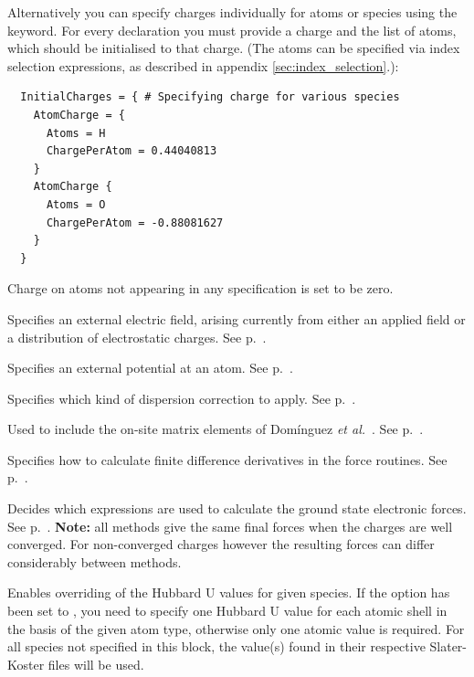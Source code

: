 \begin{description}
Alternatively you can specify charges individually for atoms or species using the 
keyword. For every  declaration you must provide a charge and the list of atoms,
which should be initialised to that charge. (The atoms can be specified via index selection
expressions, as described in appendix \ref{sec:index_selection}.):

\begin{verbatim}
  InitialCharges = { # Specifying charge for various species
    AtomCharge = {
      Atoms = H
      ChargePerAtom = 0.44040813
    }
    AtomCharge {
      Atoms = O
      ChargePerAtom = -0.88081627
    }
  }
\end{verbatim}
  Charge on atoms not appearing in any 
  specification is set to be zero.


\item[\is{ElectricField}] Specifies an external electric field,
  arising currently from either an applied field or a distribution of
  electrostatic charges. See p.~.

\item[\is{AtomSitePotential}] Specifies an external potential at an atom. See
  p.~.

\item[\is{Dispersion}] Specifies which kind of dispersion correction
  to apply. See p.~.

\item[\is{OnSiteCorrection}] Used to include the on-site matrix elements of
  Dom\'inguez {\it et al.}~\cite{dominguez15}. See p.~.

\item[\is{Differentiation}] Specifies how to calculate finite difference
  derivatives in the force routines. See p.~.

\item[\is{ForceEvaluation}] Decides which expressions are used to calculate the ground state
  electronic forces.  See p.~. \textbf{Note:} all methods give the same final
  forces when the charges are well converged. For non-converged charges however the resulting forces
  can differ considerably between methods.

\item[\is{CustomisedHubbards} / \is{CustomizedHubbards}] Enables overriding of
  the Hubbard U values for given species. If the option 
  has been set to , you need to specify one Hubbard U value for each
  atomic shell in the basis of the given atom type, otherwise only one atomic
  value is required. For all species not specified in this block, the value(s)
  found in their respective Slater-Koster files will be used.


\end{description}
